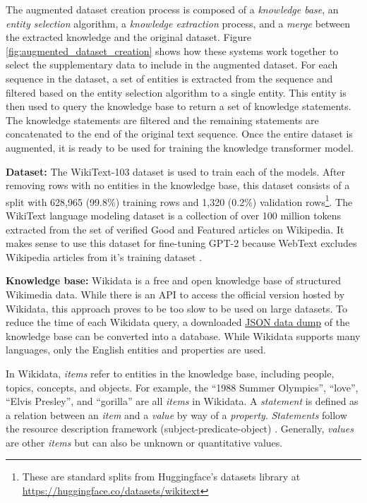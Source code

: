 \documentclass[phd,electronic,oneside,twosidetoc,letterpaper,chaptercenter,parttop,lof]{byumsphd}
\begin{document}
The augmented dataset creation process is composed of a \emph{knowledge base}, an \emph{entity selection} algorithm, a \emph{knowledge extraction} process, and a \emph{merge} between the extracted knowledge and the original dataset.
Figure \ref{fig:augmented_dataset_creation} shows how these systems work together to select the supplementary data to include in the augmented dataset. 
For each sequence in the dataset, a set of entities is extracted from the sequence and filtered based on the entity selection algorithm to a single entity.
This entity is then used to query the knowledge base to return a set of knowledge statements.
The knowledge statements are filtered and the remaining statements are concatenated to the end of the original text sequence.
Once the entire dataset is augmented, it is ready to be used for training the knowledge transformer model.

\textbf{Dataset:}
The WikiText-103 dataset \cite{merity2016pointer} is used to train each of the models. 
After removing rows with no entities in the knowledge base, this dataset consists of a split with 628,965 (99.8\%) training rows and 1,320 (0.2\%) validation rows\footnote{These are standard splits from Huggingface's datasets library at \url{https://huggingface.co/datasets/wikitext}}. 
The WikiText language modeling dataset is a collection of over 100 million tokens extracted from the set of verified Good and Featured articles on Wikipedia. 
It makes sense to use this dataset for fine-tuning GPT-2 because WebText excludes Wikipedia articles from it's training dataset \cite{radford2019language}.

\textbf{Knowledge base:}
Wikidata \cite{vrandecic2014wikidata} is a free and open knowledge base of structured \cite{cafarella2011structureddata} Wikimedia data.
While there is an API to access the official version hosted by Wikidata, this approach proves to be too slow to be used on large datasets.
To reduce the time of each Wikidata query, a downloaded \href{https://dumps.wikimedia.org/wikidatawiki/entities/}{JSON data dump} of the knowledge base can be converted into a database. 
While Wikidata supports many languages, only the English entities and properties are used. 

In Wikidata, \emph{items} refer to entities in the knowledge base, including people, topics, concepts, and objects. 
For example, the ``1988 Summer Olympics'', ``love'', ``Elvis Presley'', and ``gorilla'' are all \emph{items} in Wikidata.
A \emph{statement} is defined as a relation between an \emph{item} and a \emph{value} by way of a \emph{property}. 
\emph{Statements} follow the resource description framework (subject-predicate-object) \cite{miller1998rdf}.
Generally, \emph{values} are other \emph{items} but can also be unknown or quantitative values. 
\end{document}
